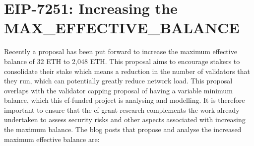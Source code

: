 \documentclass[UTF8]{article}
\begin{document}
\section{EIP-7251: Increasing the MAX\_EFFECTIVE\_BALANCE}
\label{eip7251}
Recently a proposal has been put forward to increase the maximum effective balance of 32 ETH to 2,048 ETH. This proposal aims to encourage stakers to consolidate their stake which means a reduction in the number of validators that they run, which can potentially greatly reduce network load. This proposal overlaps with the validator capping proposal of having a variable minimum balance, which this \gls{ef}-funded project is analysing and modelling. It is therefore important to ensure that the \gls{ef} grant research complements the work already undertaken to assess security risks and other aspects associated with increasing the maximum balance. The blog posts that propose and analyse the increased maximum effective balance are:
\end{document}

